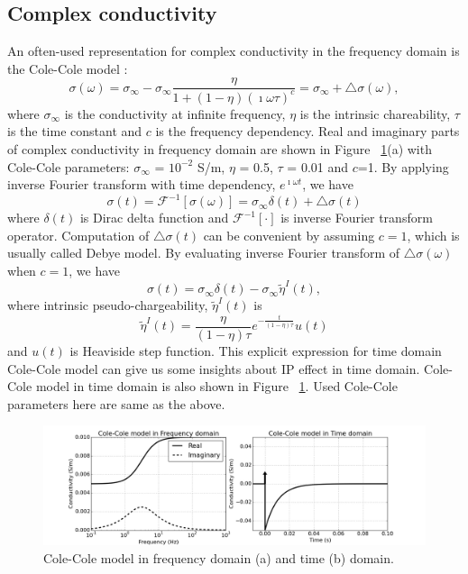 \documentclass[a4paper, 11pt]{article}
\newcommand{\siginf}{\sigma_\infty}
\newcommand{\peta}{\tilde{\eta}}
\begin{document}
\subsection{Complex conductivity}
An often-used representation for complex conductivity in the frequency domain is the Cole-Cole model \cite{COLE}:
\begin{equation}
  \sigma(\omega) = \sigma_{\infty} - \sigma_{\infty}\frac{\eta}{1+(1-\eta)(\imath\omega\tau)^c} = \sigma_{\infty} + \triangle\sigma(\omega),
  \label{eq: sigma_freq}
\end{equation}
where $\sigma_{\infty}$ is the conductivity at infinite frequency, $\eta$ is the intrinsic chareability, $\tau$ is the time constant and $c$ is the frequency dependency. Real and imaginary parts of complex conductivity in frequency domain are shown in Figure ~\ref{Fig:FDandTDCole}(a) with Cole-Cole parameters: $\siginf$ = $10^{-2}$ S/m, $\eta $ = 0.5, $\tau$ = 0.01 and $c$=1. By applying inverse Fourier transform with time dependency, $e^{\imath\omega t}$, we have
\begin{equation}
  \sigma(t) = \mathscr{F}^{-1}[\sigma(\omega)] = \sigma_{\infty}\delta(t) + \triangle\sigma(t)
  \label{eq: sigma_time}
\end{equation}
where $\delta(t)$ is Dirac delta function and $\mathscr{F}^{-1}[\cdot]$ is inverse Fourier transform operator. Computation of $\triangle\sigma(t)$ can be convenient by assuming $c=1$, which is usually called Debye model. By evaluating inverse Fourier transform of $\triangle\sigma(\omega)$ when $c=1$, we have
\begin{equation}
  \sigma(t) = \sigma_{\infty}\delta(t) - \siginf\peta^{I}(t),
  \label{eq: sigma_time_c1}
\end{equation}
where intrinsic pseudo-chargeability, $\peta^{I}(t)$ is
\begin{equation}
    \peta^{I}(t) = \frac{\eta}{(1-\eta)\tau}e^{-\frac{t}{(1-\eta)\tau}}u(t)
    \label{eq: intrinsic_peta}
\end{equation}
and $u(t)$ is Heaviside step function. This explicit expression for time domain Cole-Cole model can give us some insights about IP effect in time domain. Cole-Cole model in time domain is also shown in Figure ~\ref{Fig:FDandTDCole}. Used Cole-Cole parameters here are same as the above.

\begin{figure}[htb]
  \centering
  \includegraphics[width=1.0\textwidth]{figures/FDandTDCole.png}
  \caption{Cole-Cole model in frequency domain (a) and time (b) domain. }
  \label{Fig:FDandTDCole}
\end{figure}
\clearpage
\end{document}
